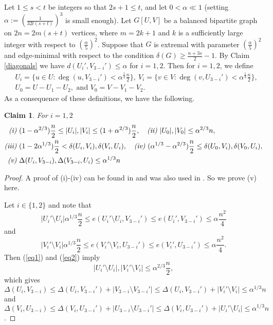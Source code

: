 \documentclass[oneside,12pt]{memoir}
\newtheorem{claim}[theorem]{Claim}
\begin{document}
Let $1\leq s<t$ be integers so that $2s+1\leq t$, and let $0<\alpha\ll 1$ (setting $\alpha:=\left(\frac{1}{32t(s+t)}\right)^{3}$ is small enough).  Let $G[U,V]$ be a balanced bipartite graph on $2n=2m(s+t)$ vertices, where $m=2k+1$ and $k$ is a sufficiently large integer with respect to $(\frac{\alpha}{5})^2$.  Suppose that $G$ is extremal with parameter $(\frac{\alpha}{5})^2$ and edge-minimal with respect to the condition $\delta(G)\geq \frac{n+3s}{2}-1$.  By Claim \ref{diagonals} we have $d(U_i',V_{3-i}')\leq \alpha$ for $i=1,2$.  Then for $i=1,2$, we define
\begin{align*}
&U_i=\{u\in U:\deg(u,V_{3-i}')<\alpha^{\frac{1}{3}}\frac{n}{2}\},~ V_i=\{v\in V:\deg(v,U_{3-i}')<\alpha^{\frac{1}{3}}\frac{n}{2}\},\\
&U_0=U-U_1-U_2, \text{ and } V_0=V-V_1-V_2.
\end{align*}
As a consequence of these definitions, we have the following.
\begin{claim}\label{bounds} For $i=1,2$
\begin{align*}
\emph{(i)}&~ (1-\alpha^{2/3})\frac{n}{2}\leq |U_i|,|V_i|\leq (1+\alpha^{2/3})\frac{n}{2},~~~  \emph{(ii)}~|U_0|,|V_0|\leq \alpha^{2/3}n,\\
\emph{(iii)}&~(1-2\alpha^{1/3})\frac{n}{2}<\delta(U_i,V_i),\delta(V_i,U_i),~~~ \emph{(iv)}~(\alpha^{1/3}-\alpha^{2/3})\frac{n}{2}\leq \delta(U_0,V_i),\delta(V_0,U_i),\\ \emph{(v)}&~\Delta(U_i,V_{3-i}), \Delta(V_{3-i},U_i)\leq \alpha^{1/3}n
\end{align*}
\end{claim}

\begin{proof}
A proof of (i)-(iv) can be found in \cite{Z} and was also used in \cite{HS}.  So we prove (v) here.  

Let $i\in \{1,2\}$ and note that 
\begin{equation}\label{eq1}
|U_i'\setminus U_i|\alpha^{1/3}\frac{n}{2}\leq e(U_i'\setminus U_i, V_{3-i}')\leq e(U_i', V_{3-i}')\leq \alpha\frac{n^2}{4}
\end{equation}
and 
\begin{equation}\label{eq2}
|V_i'\setminus V_i|\alpha^{1/3}\frac{n}{2}\leq e(V_i'\setminus V_i, U_{3-i}')\leq e(V_i', U_{3-i}')\leq \alpha\frac{n^2}{4}.
\end{equation}
Then (\ref{eq1}) and (\ref{eq2}) imply 
\begin{equation}\label{eq3}
|U_i'\setminus U_i|, |V_i'\setminus V_i|\leq \alpha^{2/3}\frac{n}{2},
\end{equation}
which gives $\Delta(U_i, V_{3-i})\leq \Delta(U_i, V_{3-i}')+|V_{3-i}\setminus V_{3-i}'|\leq \Delta(U_i, V_{3-i}')+|V_{i}'\setminus V_{i}|\leq \alpha^{1/3}n$ and $\Delta(V_i, U_{3-i})\leq \Delta(V_i, U_{3-i}')+|U_{3-i}\setminus U_{3-i}'|\leq \Delta(V_i, U_{3-i}')+|U_{i}'\setminus U_{i}|\leq \alpha^{1/3}n$.

\end{proof}
\end{document}
